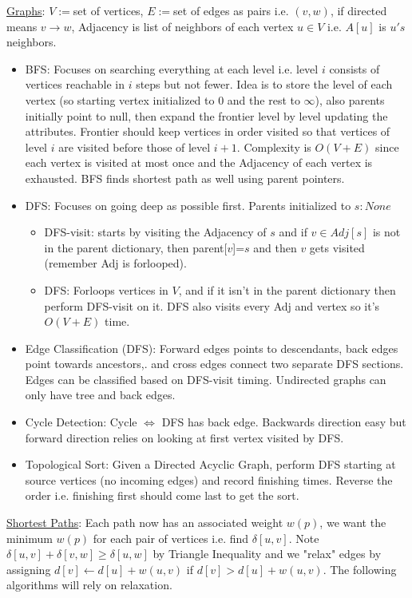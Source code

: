 \documentclass{article}
\begin{document}
\underline{Graphs}: $V:=$set of vertices, $E:=$set of edges as pairs i.e. $(v,w)$, if directed means $v\rightarrow w$, Adjacency is list of neighbors of each vertex $u\in V$ i.e. $A[u]$ is $u's$ neighbors.
\vspace{-1mm}
\begin{itemize}
\item BFS: Focuses on searching everything at each level i.e. level $i$ consists of vertices reachable in $i$ steps but not fewer. Idea is to store the level of each vertex (so starting vertex initialized to $0$ and the rest to $\infty$), also parents initially point to null, then expand the frontier level by level updating the attributes. Frontier should keep vertices in order visited so that vertices of level $i$ are visited before those of level $i+1$. Complexity is $O(V+E)$ since each vertex is visited at most once and the Adjacency of each vertex is exhausted. BFS finds shortest path as well using parent pointers.
\item DFS: Focuses on going deep as possible first. Parents initialized to $s:None$
\begin{itemize}
\item DFS-visit: starts by visiting the Adjacency of $s$ and if $v\in Adj[s]$ is not in the parent dictionary, then parent[$v$]=$s$  and then $v$ gets visited (remember Adj is forlooped).
\item DFS: Forloops vertices in $V$, and if it isn't in the parent dictionary then perform DFS-visit on it. DFS also visits every Adj and vertex so it's $O(V+E)$ time.
\end{itemize}
\item Edge Classification (DFS): Forward edges points to descendants, back edges point towards ancestors,. and cross edges connect two separate DFS sections. Edges can be classified based on DFS-visit timing. Undirected graphs can only have tree and back edges. 
\item Cycle Detection: Cycle $\Leftrightarrow$ DFS has back edge. Backwards direction easy but forward direction relies on looking at first vertex visited by DFS.
\item Topological Sort: Given a Directed Acyclic Graph, perform DFS starting at source vertices (no incoming edges) and record finishing times. Reverse the order i.e. finishing first should come last to get the sort.
\end{itemize}
\vspace{-1mm}
\underline{Shortest Paths}: Each path now has an associated weight $w(p)$, we want the minimum $w(p)$ for each pair of vertices i.e. find $\delta[u, v]$. Note $\delta[u,v]+\delta[v,w]\geq \delta[u,w]$ by Triangle Inequality and we "relax" edges by assigning $d[v]\leftarrow d[u]+w(u,v)$ if $d[v]>d[u]+w(u,v)$. The following algorithms will rely on relaxation.
\end{document}
